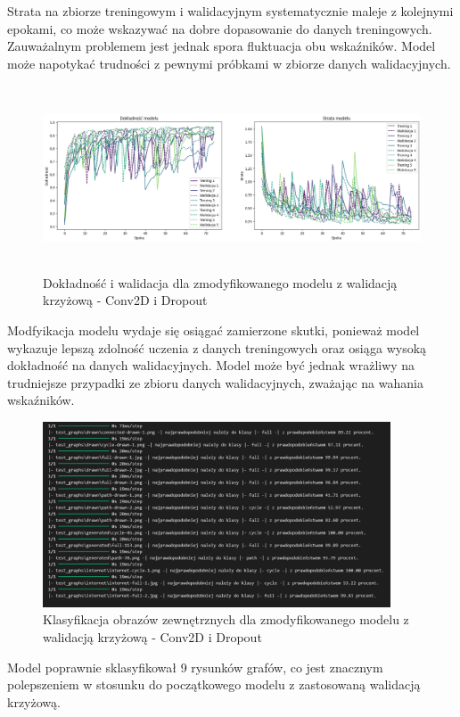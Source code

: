 Strata na zbiorze treningowym i walidacyjnym systematycznie maleje z kolejnymi epokami,
co może wskazywać na dobre dopasowanie do danych treningowych.
Zauważalnym problemem jest jednak spora fluktuacja obu wskaźników.
Model może napotykać trudności z pewnymi próbkami w zbiorze danych walidacyjnych. 

\begin{figure}[ht]
	\centering
	\includegraphics[height=5.5cm]{resources/tests/images/v4/crossvalid_1_img.png}
	\caption{Dokładność i walidacja dla zmodyfikowanego modelu z walidacją krzyżową - Conv2D i Dropout}
	\label{Fig:tests-cv-1a}
\end{figure}
\FloatBarrier

Modfyikacja modelu wydaje się osiągać zamierzone skutki,
ponieważ model wykazuje lepszą zdolność uczenia z danych treningowych
oraz osiąga wysoką dokładność na danych walidacyjnych.
Model może być jednak wrażliwy na trudniejsze przypadki ze zbioru danych walidacyjnych,
zważając na wahania wskaźników.

\begin{figure}[ht]
	\centering
	\includegraphics[height=5.5cm]{resources/tests/images/v4/crossvalid_1_txt.png}
	\caption{Klasyfikacja obrazów zewnętrznych dla zmodyfikowanego modelu z walidacją krzyżową - Conv2D i Dropout}
	\label{Fig:tests-cv-1b}
\end{figure}
\FloatBarrier

Model poprawnie sklasyfikował 9 rysunków grafów,
co jest znacznym polepszeniem w stosunku do początkowego modelu z zastosowaną walidacją krzyżową.


